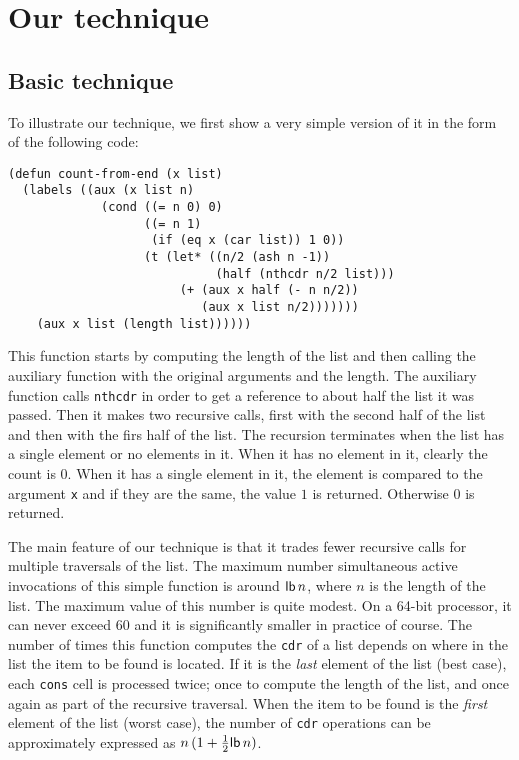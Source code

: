 \section{Our technique}

\subsection{Basic technique}

To illustrate our technique, we first show a very simple version of it
in the form of the following code:

{\small\begin{verbatim}
(defun count-from-end (x list)
  (labels ((aux (x list n)
             (cond ((= n 0) 0)
                   ((= n 1)
                    (if (eq x (car list)) 1 0))
                   (t (let* ((n/2 (ash n -1))
                             (half (nthcdr n/2 list)))
                        (+ (aux x half (- n n/2))
                           (aux x list n/2)))))))
    (aux x list (length list))))))
\end{verbatim}}

This function starts by computing the length of the list and then
calling the auxiliary function with the original arguments and the
length.  The auxiliary function calls \texttt{nthcdr} in order to get
a reference to about half the list it was passed.  Then it makes two
recursive calls, first with the second half of the list and then with
the firs half of the list.  The recursion terminates when the list has
a single element or no elements in it.  When it has no element in it,
clearly the count is $0$.  When it has a single element in it, the
element is compared to the argument \texttt{x} and if they are the
same, the value $1$ is returned.  Otherwise $0$ is returned.

The main feature of our technique is that it trades fewer recursive
calls for multiple traversals of the list.  The maximum number%
simultaneous active invocations of this simple function is around
$\mathsf{lb}\thinspace n$, where $n$ is the length of the list.  The
maximum value of this number is quite modest.  On a 64-bit processor,
it can never exceed $60$ and it is significantly smaller in practice
of course.  The number of times this function computes the
\texttt{cdr} of a list depends on where in the list the item to be
found is located.  If it is the \emph{last} element of the list (best
case), each \texttt{cons} cell is processed twice; once to compute the
length of the list, and once again as part of the recursive traversal.
When the item to be found is the \emph{first} element of the list
(worst case), the number of \texttt{cdr} operations can be
approximately expressed as $n\thinspace (1 +
\frac{1}{2}\mathsf{lb}\thinspace n)$.

